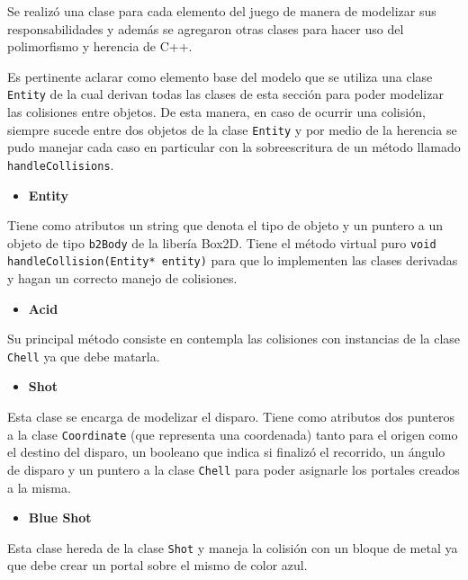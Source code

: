 \documentclass[a4paper]{article}
\begin{document}
Se realizó una clase para cada elemento del juego de manera de modelizar sus responsabilidades y además se agregaron otras clases para hacer uso del polimorfismo y herencia de C++.

Es pertinente aclarar como elemento base del modelo que se utiliza una clase \texttt{Entity} de la cual derivan todas las clases de esta sección para poder modelizar las colisiones entre objetos. De esta manera, en caso de ocurrir una colisión, siempre sucede entre dos objetos de la clase \texttt{Entity} y por medio de la herencia se pudo manejar cada caso en particular con la sobreescritura de un método llamado \texttt{handleCollisions}. 

\begin{itemize}
	\item \textbf{Entity}
\end{itemize}

Tiene como atributos un string que denota el tipo de objeto y un puntero a un objeto de tipo \texttt{b2Body} de la libería Box2D. Tiene el método virtual puro \texttt{void handleCollision(Entity* entity)} para que lo implementen las clases derivadas y hagan un correcto manejo de colisiones.

\begin{itemize}
	\item \textbf{Acid}
\end{itemize}

Su principal método consiste en contempla las colisiones con instancias de la clase \texttt{Chell} ya que debe matarla.

\begin{itemize}
	\item \textbf{Shot}
\end{itemize}

Esta clase se encarga de modelizar el disparo. Tiene como atributos dos punteros a la clase \texttt{Coordinate} (que representa una coordenada) tanto para el origen como el destino del disparo, un booleano que indica si finalizó el recorrido, un ángulo de disparo y un puntero a la clase \texttt{Chell} para poder asignarle los portales creados a la misma.

\begin{itemize}
	\item \textbf{Blue Shot}
\end{itemize}

Esta clase hereda de la clase \texttt{Shot} y maneja la colisión con un bloque de metal ya que debe crear un portal sobre el mismo de color azul.
\end{document}
